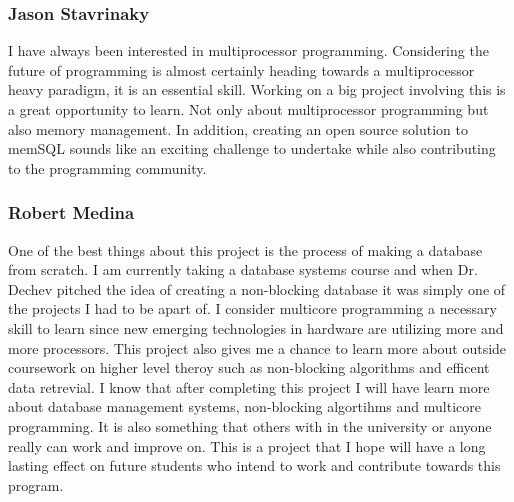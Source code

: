 \documentclass[letterpaper, 12pt]{article}
\begin{document}
\subsubsection{Jason Stavrinaky}
I have always been interested in multiprocessor programming.  Considering the
future  of  programming  is  almost  certainly  heading  towards  a  multiprocessor
heavy paradigm, it is an essential skill.  Working on a big project involving this
is a great opportunity to learn.  Not only about multiprocessor programming
but also memory management.  In addition, creating an open source solution to
memSQL sounds like an exciting challenge to undertake while also contributing
to the programming community.

\subsubsection{Robert Medina}
One of the best things about this project is the process of making a database from scratch.
I am currently taking a database systems course and when Dr. Dechev pitched the idea of
creating a non-blocking database it was simply one of the projects I had to be apart of.
I consider multicore programming a necessary skill to learn since new emerging technologies
in hardware are utilizing more and more processors. This project also gives me a chance to
learn more about outside coursework on higher level theroy such as non-blocking algorithms
and efficent data retrevial. I know that after completing this project I will have learn
more about database management systems, non-blocking algortihms and multicore programming.
It is also something that others with in the university or anyone really can work and improve
on. This is a project that I hope will have a long lasting effect on future students who
intend to work and contribute towards this program.

\newpage
\end{document}
